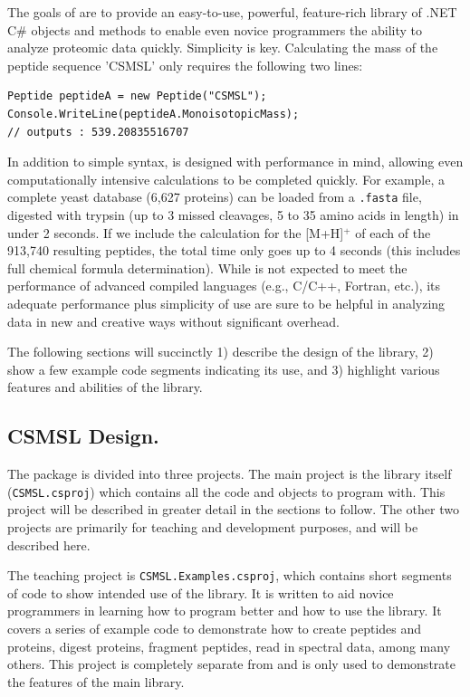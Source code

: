The goals of \csmsl{} are to provide an easy-to-use, powerful, feature-rich library of .NET C\# objects and methods to enable even novice programmers the ability to analyze proteomic data quickly. Simplicity is key. Calculating the mass of the peptide sequence 'CSMSL' only requires the following two lines:
\begin{lstlisting}
Peptide peptideA = new Peptide("CSMSL");
Console.WriteLine(peptideA.MonoisotopicMass);
// outputs : 539.20835516707
\end{lstlisting}
In addition to simple syntax, \csmsl{} is designed with performance in mind, allowing even computationally intensive calculations to be completed quickly. For example, a complete yeast database (6,627 proteins) can be loaded from a \texttt{.fasta} file, digested with trypsin (up to 3 missed cleavages, 5 to 35 amino acids in length) in under 2 seconds. If we include the calculation for the [M+H]$^+$ \mz{} of each of the 913,740 resulting peptides, the total time only goes up to 4 seconds (this includes full chemical formula determination). While \csmsl{} is not expected to meet the performance of advanced compiled languages (e.g., C/C++, Fortran, etc.), its adequate performance plus simplicity of use are sure to be helpful in analyzing data in new and creative ways without significant overhead.

The following sections will succinctly 1) describe the design of the library, 2) show a few example code segments indicating its use, and 3) highlight various features and abilities of the library.

\subsection*{CSMSL Design.}
The \csmsl{} package is divided into three projects. The main project is the library itself (\texttt{CSMSL.csproj}) which contains all the code and objects to program with. This project will be described in greater detail in the sections to follow. The other two projects are primarily for teaching and development purposes, and will be described here. 

The teaching project is \texttt{CSMSL.Examples.csproj}, which contains short segments of code to show intended use of the library. It is written to aid novice programmers in learning how to program better and how to use the library. It covers a series of example code to demonstrate how to create peptides and proteins, digest proteins, fragment peptides, read in spectral data, among many others. This project is completely separate from \csmsl{} and is only used to demonstrate the features of the main library. 

